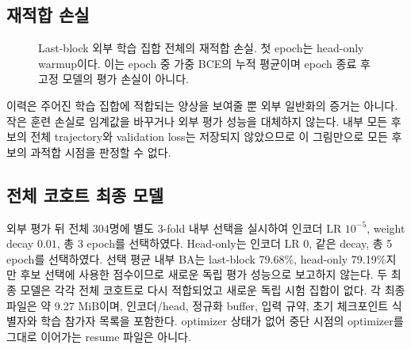 \documentclass[11pt,a4paper]{article}
\begin{document}
\subsection{재적합 손실}
\begin{figure}[H]\centering
{}
\caption{Last-block 외부 학습 집합 전체의 재적합 손실. 첫 epoch는 head-only warmup이다.
이는 epoch 중 가중 BCE의 누적 평균이며 epoch 종료 후 고정 모델의 평가 손실이 아니다.}
\end{figure}
이력은 주어진 학습 집합에 적합되는 양상을 보여줄 뿐 외부 일반화의 증거는 아니다.
작은 훈련 손실로 임계값을 바꾸거나 외부 평가 성능을 대체하지 않는다.
내부 모든 후보의 전체 trajectory와 validation loss는 저장되지 않았으므로
이 그림만으로 모든 후보의 과적합 시점을 판정할 수 없다.

\subsection{전체 코호트 최종 모델}
외부 평가 뒤 전체 304명에 별도 3-fold 내부 선택을 실시하여
인코더 LR $10^{-5}$, weight decay $0.01$, 총 3 epoch를 선택하였다.
Head-only는 인코더 LR 0, 같은 decay, 총 5 epoch를 선택하였다.
선택 평균 내부 BA는 last-block 79.68\%, head-only 79.19\%지만 후보 선택에 사용한 점수이므로
새로운 독립 평가 성능으로 보고하지 않는다.
두 최종 모델은 각각 전체 코호트로 다시 적합되었고 새로운 독립 시험 집합이 없다.
각 최종 파일은 약 9.27 MiB이며, 인코더/head, 정규화 buffer, 입력 규약,
초기 체크포인트 식별자와 학습 참가자 목록을 포함한다.
optimizer 상태가 없어 중단 시점의 optimizer를 그대로 이어가는 resume 파일은 아니다.
\end{document}
